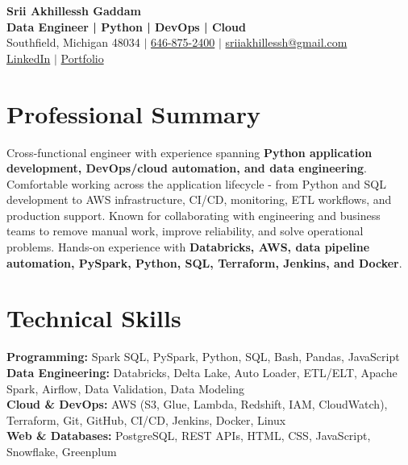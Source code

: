 \documentclass[letterpaper,10pt]{article}
\begin{document}
\fontsize{9.35pt}{10.45pt}\selectfont

\begin{center}
    {\LARGE \textbf{Srii Akhillessh Gaddam}} \\[-1pt]
    \textbf{Data Engineer | Python | DevOps | Cloud} \\[2pt]
    Southfield, Michigan 48034 $|$
    \href{tel:6468752400}{646-875-2400} $|$
    \href{mailto:sriiakhillessh@gmail.com}{sriiakhillessh@gmail.com} \\[1pt]
    \href{https://www.linkedin.com/in/srii-akhiilessh-gaddam-b48668191/}{LinkedIn} $|$
    \href{https://sriiakhillesshg.github.io/portfolio/}{Portfolio}
\end{center}
\vspace{-8pt}

\section{Professional Summary}
\small{Cross-functional engineer with experience spanning \textbf{Python application development, DevOps/cloud automation, and data engineering}. Comfortable working across the application lifecycle - from Python and SQL development to AWS infrastructure, CI/CD, monitoring, ETL workflows, and production support. Known for collaborating with engineering and business teams to remove manual work, improve reliability, and solve operational problems. Hands-on experience with \textbf{Databricks, AWS, data pipeline automation, PySpark, Python, SQL, Terraform, Jenkins, and Docker}.}

\section{Technical Skills}
\small{
\textbf{Programming:} Spark SQL, PySpark, Python, SQL, Bash, Pandas, JavaScript \\
\textbf{Data Engineering:} Databricks, Delta Lake, Auto Loader, ETL/ELT, Apache Spark, Airflow, Data Validation, Data Modeling \\
\textbf{Cloud \& DevOps:} AWS (S3, Glue, Lambda, Redshift, IAM, CloudWatch), Terraform, Git, GitHub, CI/CD, Jenkins, Docker, Linux \\
\textbf{Web \& Databases:} PostgreSQL, REST APIs, HTML, CSS, JavaScript, Snowflake, Greenplum
}

\end{document}
